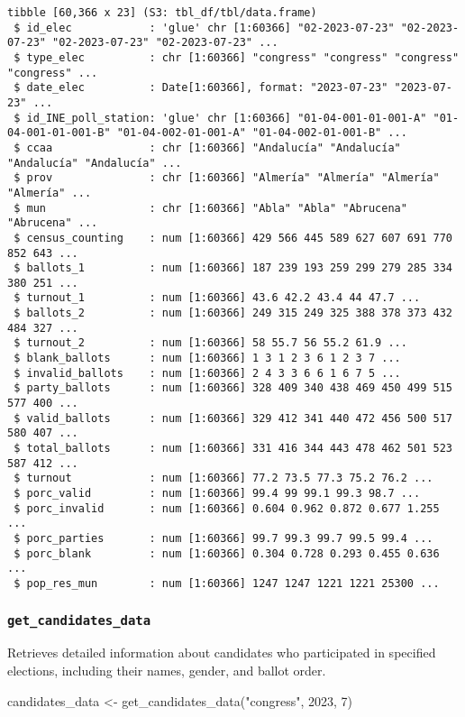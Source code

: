 \documentclass[
  letterpaper,
  DIV=11,
  numbers=noendperiod]{scrreprt}
\newenvironment{Shaded}{\begin{snugshade}}{\end{snugshade}}
\newcommand{\DecValTok}[1]{\textcolor[rgb]{0.68,0.00,0.00}{#1}}
\newcommand{\FunctionTok}[1]{\textcolor[rgb]{0.28,0.35,0.67}{#1}}
\newcommand{\NormalTok}[1]{\textcolor[rgb]{0.00,0.23,0.31}{#1}}
\newcommand{\OtherTok}[1]{\textcolor[rgb]{0.00,0.23,0.31}{#1}}
\newcommand{\StringTok}[1]{\textcolor[rgb]{0.13,0.47,0.30}{#1}}
\begin{document}
\begin{verbatim}
tibble [60,366 x 23] (S3: tbl_df/tbl/data.frame)
 $ id_elec            : 'glue' chr [1:60366] "02-2023-07-23" "02-2023-07-23" "02-2023-07-23" "02-2023-07-23" ...
 $ type_elec          : chr [1:60366] "congress" "congress" "congress" "congress" ...
 $ date_elec          : Date[1:60366], format: "2023-07-23" "2023-07-23" ...
 $ id_INE_poll_station: 'glue' chr [1:60366] "01-04-001-01-001-A" "01-04-001-01-001-B" "01-04-002-01-001-A" "01-04-002-01-001-B" ...
 $ ccaa               : chr [1:60366] "Andalucía" "Andalucía" "Andalucía" "Andalucía" ...
 $ prov               : chr [1:60366] "Almería" "Almería" "Almería" "Almería" ...
 $ mun                : chr [1:60366] "Abla" "Abla" "Abrucena" "Abrucena" ...
 $ census_counting    : num [1:60366] 429 566 445 589 627 607 691 770 852 643 ...
 $ ballots_1          : num [1:60366] 187 239 193 259 299 279 285 334 380 251 ...
 $ turnout_1          : num [1:60366] 43.6 42.2 43.4 44 47.7 ...
 $ ballots_2          : num [1:60366] 249 315 249 325 388 378 373 432 484 327 ...
 $ turnout_2          : num [1:60366] 58 55.7 56 55.2 61.9 ...
 $ blank_ballots      : num [1:60366] 1 3 1 2 3 6 1 2 3 7 ...
 $ invalid_ballots    : num [1:60366] 2 4 3 3 6 6 1 6 7 5 ...
 $ party_ballots      : num [1:60366] 328 409 340 438 469 450 499 515 577 400 ...
 $ valid_ballots      : num [1:60366] 329 412 341 440 472 456 500 517 580 407 ...
 $ total_ballots      : num [1:60366] 331 416 344 443 478 462 501 523 587 412 ...
 $ turnout            : num [1:60366] 77.2 73.5 77.3 75.2 76.2 ...
 $ porc_valid         : num [1:60366] 99.4 99 99.1 99.3 98.7 ...
 $ porc_invalid       : num [1:60366] 0.604 0.962 0.872 0.677 1.255 ...
 $ porc_parties       : num [1:60366] 99.7 99.3 99.7 99.5 99.4 ...
 $ porc_blank         : num [1:60366] 0.304 0.728 0.293 0.455 0.636 ...
 $ pop_res_mun        : num [1:60366] 1247 1247 1221 1221 25300 ...
\end{verbatim}

\hypertarget{get_candidates_data}{%
\subsubsection{\texorpdfstring{\texttt{get\_candidates\_data}}{get\_candidates\_data}}\label{get_candidates_data}}

Retrieves detailed information about candidates who participated in
specified elections, including their names, gender, and ballot order.

\begin{Shaded}
\begin{Highlighting}[]
\NormalTok{candidates\_data }\OtherTok{\textless{}{-}} \FunctionTok{get\_candidates\_data}\NormalTok{(}\StringTok{"congress"}\NormalTok{, }\DecValTok{2023}\NormalTok{, }\DecValTok{7}\NormalTok{)}
\end{Highlighting}
\end{Shaded}
\end{document}
